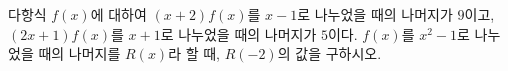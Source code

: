 다항식 $f(x)$에 대하여 $(x+2)f(x)$를 $x-1$로 나누었을 때의 나머지가 $9$이고, $(2x+1)f(x)$를 $x+1$로 나누었을 때의 나머지가 $5$이다. $f(x)$를 $x^2-1$로 나누었을 때의 나머지를 $R(x)$라 할 때, $R(-2)$의 값을 구하시오.
